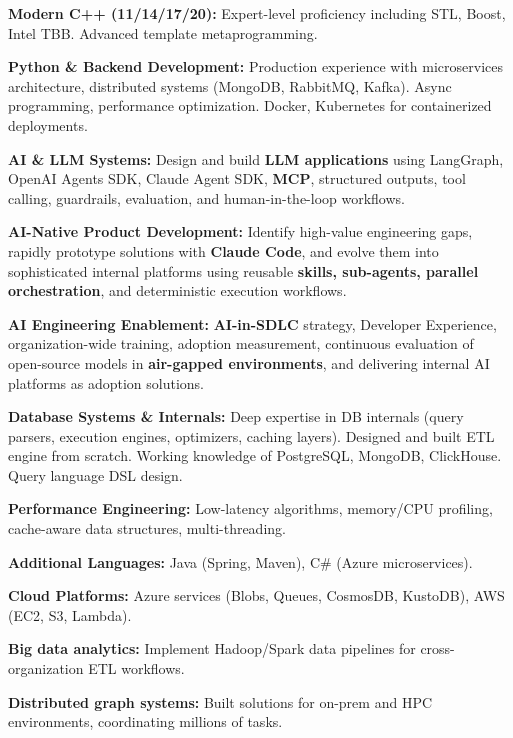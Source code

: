 \begin{cventries}
  \cventry
    {}
    {}
    {}
    {}
    {
      \begin{cvitems}
        \item \textbf{Modern C++ (11/14/17/20):} Expert-level proficiency including STL, Boost, Intel TBB. Advanced template metaprogramming.
        \item \textbf{Python \& Backend Development:} Production experience with microservices architecture, distributed systems (MongoDB, RabbitMQ, Kafka). Async programming, performance optimization. Docker, Kubernetes for containerized deployments.
        \item \textbf{AI \& LLM Systems:} Design and build \textbf{LLM applications} using LangGraph, OpenAI Agents SDK, Claude Agent SDK, \textbf{MCP}, structured outputs, tool calling, guardrails, evaluation, and human-in-the-loop workflows.
        \item \textbf{AI-Native Product Development:} Identify high-value engineering gaps, rapidly prototype solutions with \textbf{Claude Code}, and evolve them into sophisticated internal platforms using reusable \textbf{skills, sub-agents, parallel orchestration}, and deterministic execution workflows.
        \item \textbf{AI Engineering Enablement:} \textbf{AI-in-SDLC} strategy, Developer Experience, organization-wide training, adoption measurement, continuous evaluation of open-source models in \textbf{air-gapped environments}, and delivering internal AI platforms as adoption solutions.
        \item \textbf{Database Systems \& Internals:} Deep expertise in DB internals (query parsers, execution engines, optimizers, caching layers). Designed and built ETL engine from scratch. Working knowledge of PostgreSQL, MongoDB, ClickHouse. Query language DSL design.
        \item \textbf{Performance Engineering:} Low-latency algorithms, memory/CPU profiling, cache-aware data structures, multi-threading.
        \item \textbf{Additional Languages:} Java (Spring, Maven), C\# (Azure microservices).
        \item \textbf{Cloud Platforms:} Azure services (Blobs, Queues, CosmosDB, KustoDB), AWS (EC2, S3, Lambda).
        \item \textbf{Big data analytics:} Implement Hadoop/Spark data pipelines for cross-organization ETL workflows.
        \item \textbf{Distributed graph systems:} Built solutions for on-prem and HPC environments, coordinating millions of tasks.
      \end{cvitems}
    }
\end{cventries}